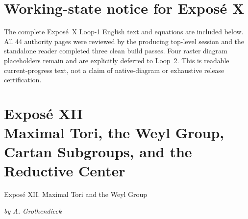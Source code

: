 \documentclass[11pt,a4paper,oneside]{book}
\begin{document}
\clearpage
{}
\makeatletter
\tagsleft@true
\let\veqno\@@leqno
\makeatother





\makeatletter
\tagsleft@false
\let\veqno\@@eqno
\makeatother
\restoregeometry

\clearpage
\chapter*{Working-state notice for Expos\'e X}
The complete Expos\'e~X Loop-1 English text and equations are included below.
All 44 authority pages were reviewed by the producing top-level session and
the standalone reader completed three clean build passes. Four raster
diagram placeholders remain and are explicitly deferred to Loop~2. This is
readable current-progress text, not a claim of native-diagram or exhaustive
release certification.




\clearpage
{}
\makeatletter
\tagsleft@true
\let\veqno\@@leqno
\makeatother











\makeatletter
\tagsleft@false
\let\veqno\@@eqno
\makeatother
\restoregeometry

\clearpage
{}
\makeatletter
\tagsleft@true
\let\veqno\@@leqno
\makeatother
\setcounter{section}{0}
\chapter*{Expos\'e XII\\
  Maximal Tori, the Weyl Group, Cartan Subgroups, and the Reductive Center}
  {Expos\'e XII. Maximal Tori and the Weyl Group}
\begin{center}
  \textit{by A. Grothendieck}
\end{center}



\makeatletter
\tagsleft@false
\let\veqno\@@eqno
\makeatother
\restoregeometry
\end{document}
